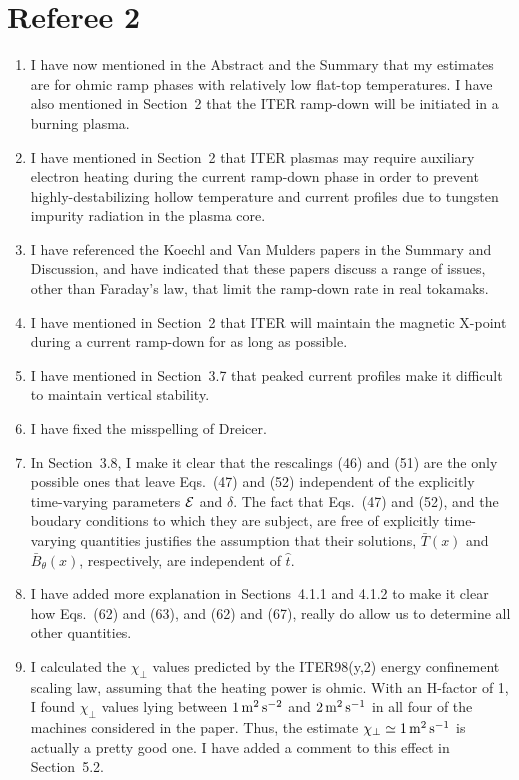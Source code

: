 \documentclass{article}[12pt]
\begin{document}
\section*{Referee 2}
\begin{enumerate}
\item I have now mentioned in the Abstract and the Summary that my estimates are for ohmic ramp phases with relatively low flat-top
temperatures. I have also mentioned in Section~2 that the ITER ramp-down will be initiated in a burning plasma.
\item I have mentioned in Section~2 that ITER plasmas may require auxiliary electron heating during the current ramp-down phase
in order to prevent highly-destabilizing hollow temperature and current profiles due to tungsten impurity radiation in the plasma core. 
\item I have referenced the Koechl and Van Mulders papers in the Summary and Discussion, and have indicated that these papers
discuss a range of issues, other than Faraday's law, that limit the ramp-down rate in real tokamaks. 
\item I have mentioned in Section~2 that ITER will maintain the magnetic X-point during a current ramp-down for as long as possible. 
\item I have mentioned in Section~3.7 that peaked current profiles make it difficult to maintain vertical stability.
\item I have fixed the misspelling of Dreicer.
\item In Section~3.8, I make it clear that the rescalings (46) and (51) are the only possible ones that leave Eqs.~(47) and (52)
independent of the explicitly time-varying parameters ${\cal E}$ and $\delta$. The fact that Eqs.~(47) and (52), and the boudary
conditions to which they are subject, are free of explicitly time-varying quantities justifies the assumption that their
solutions, $\bar{T}(x)$ and $\bar{B}_\theta(x)$, respectively, are independent of $\hat{t}$. 
\item I have added more explanation in Sections~4.1.1 and 4.1.2 to make it clear how Eqs.~(62) and (63), and (62) and (67), really
do allow us to determine all other quantities.
\item I calculated the $\chi_\perp$ values predicted by the ITER98(y,2) energy confinement scaling law, assuming that the heating power is
ohmic. With an H-factor of 1, I found $\chi_\perp$ values lying between $1\,{\rm m}^2\,{\rm s}^{-2}$ and $2\,{\rm m}^2\,{\rm s}^{-1}$ 
in all four of the machines considered in the paper. Thus, the estimate $\chi_\perp\simeq 1\,{\rm m}^2\,{\rm s}^{-1}$ is actually a pretty good one. 
I have added a comment to this effect in Section~5.2.
\end{enumerate}
\end{document}
